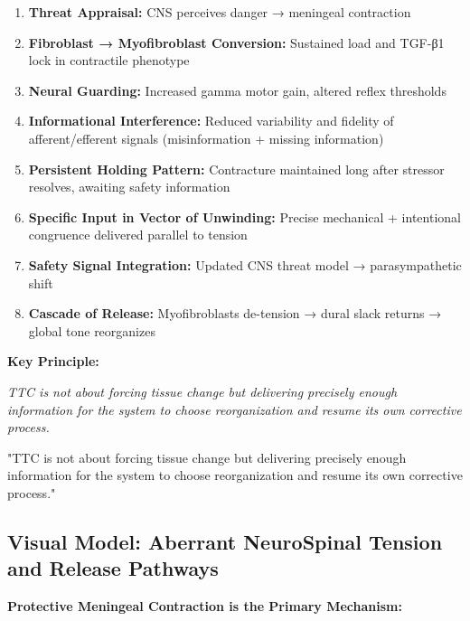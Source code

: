 \documentclass[11pt,letterpaper]{article}
\begin{document}
\begin{enumerate}
\item \textbf{Threat Appraisal:} CNS perceives danger → meningeal contraction
\item \textbf{Fibroblast → Myofibroblast Conversion:} Sustained load and TGF-β1 lock in contractile phenotype
\item \textbf{Neural Guarding:} Increased gamma motor gain, altered reflex thresholds
\item \textbf{Informational Interference:} Reduced variability and fidelity of afferent/efferent signals (misinformation + missing information)
\item \textbf{Persistent Holding Pattern:} Contracture maintained long after stressor resolves, awaiting safety information
\item \textbf{Specific Input in Vector of Unwinding:} Precise mechanical + intentional congruence delivered parallel to tension
\item \textbf{Safety Signal Integration:} Updated CNS threat model → parasympathetic shift
\item \textbf{Cascade of Release:} Myofibroblasts de-tension → dural slack returns → global tone reorganizes
\end{enumerate}

\textbf{Key Principle:}

\textit{TTC is not about forcing tissue change but delivering precisely enough information for the system to choose reorganization and resume its own corrective process.}


\begin{pullquotebox}
"TTC is not about forcing tissue change but delivering precisely enough information for the system to choose reorganization and resume its own corrective process."
\end{pullquotebox}


\subsection{Visual Model: Aberrant NeuroSpinal Tension and Release Pathways}

\textbf{Protective Meningeal Contraction is the Primary Mechanism:}
\end{document}
